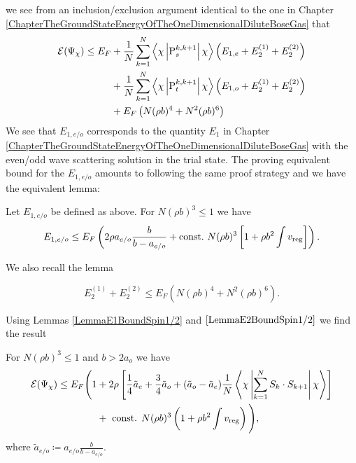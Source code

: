 we see from an inclusion/exclusion argument identical to the one in Chapter \ref{ChapterTheGroundStateEnergyOfTheOneDimensionalDiluteBoseGas} that \begin{equation}\label{EqTrialStateEnergyUpperBound2}
\begin{aligned}
\mathcal{E}(\Psi_{\chi})\leq E_F &+\frac{1}{N}\sum_{k=1}^{N}\left\langle\chi \left\lvert \operatorname{P}^{k,k+1}_s  \right\rvert \chi\right\rangle \left(E_{1,e}+E_2^{(1)}+E_2^{(2)}\right)\\
&+\frac{1}{N}\sum_{k=1}^{N}\left\langle\chi \left\lvert \operatorname{P}^{k,k+1}_t  \right\rvert \chi\right\rangle \left(E_{1,o}+E_2^{(1)}+E_2^{(2)}\right)\\
&+E_F\left(N(\rho b)^4+ N^2 (\rho b)^6\right)
\end{aligned}
\end{equation}
We see that $ E_{1,e/o} $ corresponds to the quantity $ E_1 $ in Chapter \ref{ChapterTheGroundStateEnergyOfTheOneDimensionalDiluteBoseGas} with the even/odd wave scattering solution in the trial state. The proving equivalent bound for the $ E_{1,e/o} $ amounts to following the same proof strategy and we have the equivalent lemma:
\begin{lemma}\label{LemmaE1BoundSpin1/2}
	Let $ E_{1,e/o} $ be defined as above. For $ N(\rho b)^3\leq 1 $ we have \begin{equation}
	E_{1,e/o}\leq E_F \left(2\rho a_{e/o}\frac{b}{b-a_{e/o}}+ \textnormal{const.}\ N(\rho b)^3\left[ 1+ \rho b^2\int v_{\textnormal{reg}}\right]\right).
	\end{equation}
\end{lemma}
We also recall the lemma\begin{lemma}\label{LemmaE2BoundSpin1/2}
	\begin{equation}
	E_2^{(1)}+E_2^{(2)}\leq E_F\left(N (\rho b)^4+ N^2(\rho b)^6\right).
	\end{equation}
\end{lemma}
Using Lemmas \ref{LemmaE1BoundSpin1/2} and $ \ref{LemmaE2BoundSpin1/2} $ we find the result 
\begin{lemma}\label{LemmaTrialStateEnergySpin1/2}
	For $ N(\rho b)^3\leq  1 $ and $ b>2 a_o $ we have \begin{equation}\label{EqTrialStateEnergyBound1}
	\begin{aligned}
	\mathcal{E}(\Psi_{\chi})\leq E_F\Bigg( 1&+2\rho\left[\frac{1}{4}\tilde{a}_e+\frac{3}{4}\tilde{a}_o+(\tilde{a}_o-\tilde{a}_e)\frac{1}{N}\left\langle\chi \left\vert \sum_{k=1}^N S_k\cdot S_{k+1}\right\vert \chi\right\rangle\right]\\ &+\textnormal{ const. } N (\rho b)^3\left(1+\rho b^2\int v_{\textnormal{reg}}\right) \Bigg),
	\end{aligned}
	\end{equation}
	where $ \tilde{a}_{e/o}\coloneqq a_{e/o}\frac{b}{b-a_{e/o}} $.
\end{lemma}
